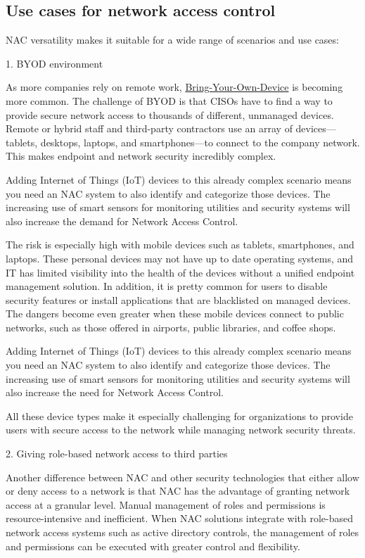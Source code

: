\subsection{Use cases for network access control}

NAC versatility makes it suitable for a wide range of scenarios and use cases:

1. BYOD environment

As more companies rely on remote work, \href{https://www.citrix.com/solutions/unified-endpoint-management/what-is-byod.html}{Bring-Your-Own-Device} is becoming more common. The challenge of BYOD is that CISOs have to find a way to provide secure network access to thousands of different, unmanaged devices. Remote or hybrid staff and third-party contractors use an array of devices—tablets, desktops, laptops, and smartphones—to connect to the company network. This makes endpoint and network security incredibly complex.

Adding Internet of Things (IoT) devices to this already complex scenario means you need an NAC system to also identify and categorize those devices. The increasing use of smart sensors for monitoring utilities and security systems will also increase the demand for Network Access Control.

The risk is especially high with mobile devices such as tablets, smartphones, and laptops. These personal devices may not have up to date operating systems, and IT has limited visibility into the health of the devices without a unified endpoint management solution. In addition, it is pretty common for users to disable security features or install applications that are blacklisted on managed devices. The dangers become even greater when these mobile devices connect to public networks, such as those offered in airports, public libraries, and coffee shops.

Adding Internet of Things (IoT) devices to this already complex scenario means you need an NAC system to also identify and categorize those devices. The increasing use of smart sensors for monitoring utilities and security systems will also increase the need for Network Access Control.

All these device types make it especially challenging for organizations to provide users with secure access to the network while managing network security threats.

2. Giving role-based network access to third parties

Another difference between NAC and other security technologies that either allow or deny access to a network is that NAC has the advantage of granting network access at a granular level. Manual management of roles and permissions is resource-intensive and inefficient. When NAC solutions integrate with role-based network access systems such as active directory controls, the management of roles and permissions can be executed with greater control and flexibility.

